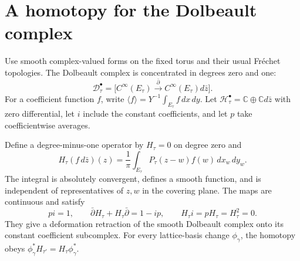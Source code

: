 \section{A homotopy for the Dolbeault complex}

Use smooth complex-valued forms on the fixed torus and their usual Fr\'echet topologies.
The Dolbeault complex is concentrated in degrees zero and one:
\[
 \mathcal D_\tau^\bullet=
 \bigl[C^\infty(E_\tau)\xrightarrow{\bar\partial}
       C^\infty(E_\tau)d\bar z\bigr].
\]
For a coefficient function $f$, write
$\langle f\rangle=Y^{-1}\int_{E_\tau}f\,dx\,dy$.
Let $\mathcal H_\tau^\bullet=\mathbb C\oplus\mathbb C d\bar z$ with zero differential, let $i$ include the constant coefficients, and let $p$ take coefficientwise averages.

\begin{theorem}\label{thm:ep-homotopy}
Define a degree-minus-one operator by $H_\tau=0$ on degree zero and
\begin{equation}\label{eq:ep-H}
 H_\tau(f\,d\bar z)(z)=\frac1\pi
             \int_{E_\tau}P_\tau(z-w)f(w)\,dx_w\,dy_w.
\end{equation}
The integral is absolutely convergent, defines a smooth function, and is independent of representatives of $z,w$ in the covering plane.
The maps are continuous and satisfy
\[
 p i=1,\qquad \bar\partial H_\tau+H_\tau\bar\partial=1-ip,
 \qquad H_\tau i=pH_\tau=H_\tau^2=0.
\]
They give a deformation retraction of the smooth Dolbeault complex onto its constant coefficient subcomplex.
For every lattice-basis change $\phi_\gamma$, the homotopy obeys
$\phi_\gamma^*H_{\tau'}=H_\tau\phi_\gamma^*$.
\end{theorem}
